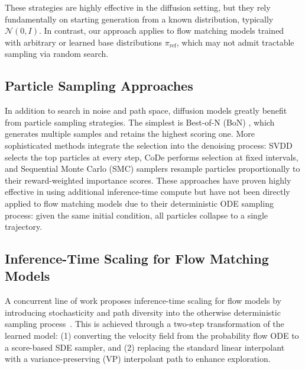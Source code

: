 \documentclass{article}
\begin{document}
These strategies are highly effective in the diffusion setting, but they rely fundamentally on starting generation from a known distribution, typically \( \mathcal{N}(0, I) \). In contrast, our approach applies to flow matching models trained with arbitrary or learned base distributions \( \pi_{\mathrm{ref}} \), which may not admit tractable sampling via random search.

\subsection{Particle Sampling Approaches}

In addition to search in noise and path space, diffusion models greatly benefit from particle sampling strategies. The simplest is Best-of-N (BoN) \cite{fan2023bon, holtzman2020curious}, which generates multiple samples and retains the highest scoring one. More sophisticated methods integrate the selection into the denoising process: SVDD \cite{ma2025diffits} selects the top particles at every step, CoDe \cite{singh2025code} performs selection at fixed intervals, and Sequential Monte Carlo (SMC) samplers \cite{song2024smc, xu2024smc} resample particles proportionally to their reward-weighted importance scores. These approaches have proven highly effective in using additional inference-time compute but have not been directly applied to flow matching models due to their deterministic ODE sampling process: given the same initial condition, all particles collapse to a single trajectory. 

\subsection{Inference-Time Scaling for Flow Matching Models}

A concurrent line of work proposes inference-time scaling for flow models by introducing stochasticity and path diversity into the otherwise deterministic sampling process~\cite{kim2025flowits}. This is achieved through a two-step transformation of the learned model: (1) converting the velocity field from the probability flow ODE to a score-based SDE sampler, and (2) replacing the standard linear interpolant with a variance-preserving (VP) interpolant path to enhance exploration.
\end{document}
